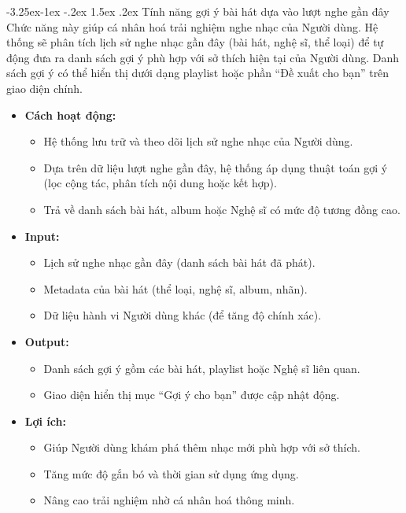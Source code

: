 \documentclass[a4paper]{article}
\makeatletter
\newcommand{\cach}{\hspace*{1.5em}\ignorespaces}
\newcounter {subsubsubsection}[subsubsection]
\newcommand\subsubsubsection{\@startsection{subsubsubsection}{4}{\z@}%
                                     {-3.25ex\@plus -1ex \@minus -.2ex}%
                                     {1.5ex \@plus .2ex}%
                                     {\normalfont\normalsize\bfseries}}
\makeatother
\begin{document}
\subsubsubsection{Tính năng gợi ý bài hát dựa vào lượt nghe gần đây}
\cach Chức năng này giúp cá nhân hoá trải nghiệm nghe nhạc của Người dùng. 
Hệ thống sẽ phân tích lịch sử nghe nhạc gần đây (bài hát, nghệ sĩ, thể loại) để tự động đưa ra danh sách gợi ý phù hợp với sở thích hiện tại của Người dùng. 
Danh sách gợi ý có thể hiển thị dưới dạng playlist hoặc phần “Đề xuất cho bạn” trên giao diện chính.
\begin{itemize}
    \item \textbf{Cách hoạt động:}
    \begin{itemize}
        \item Hệ thống lưu trữ và theo dõi lịch sử nghe nhạc của Người dùng.
        \item Dựa trên dữ liệu lượt nghe gần đây, hệ thống áp dụng thuật toán gợi ý (lọc cộng tác, phân tích nội dung hoặc kết hợp).
        \item Trả về danh sách bài hát, album hoặc Nghệ sĩ có mức độ tương đồng cao.
    \end{itemize}

    \item \textbf{Input:}
    \begin{itemize}
        \item Lịch sử nghe nhạc gần đây (danh sách bài hát đã phát).
        \item Metadata của bài hát (thể loại, nghệ sĩ, album, nhãn).
        \item Dữ liệu hành vi Người dùng khác (để tăng độ chính xác).
    \end{itemize}

    \item \textbf{Output:}
    \begin{itemize}
        \item Danh sách gợi ý gồm các bài hát, playlist hoặc Nghệ sĩ liên quan.
        \item Giao diện hiển thị mục “Gợi ý cho bạn” được cập nhật động.
    \end{itemize}

    \item \textbf{Lợi ích:}
    \begin{itemize}
        \item Giúp Người dùng khám phá thêm nhạc mới phù hợp với sở thích.
        \item Tăng mức độ gắn bó và thời gian sử dụng ứng dụng.
        \item Nâng cao trải nghiệm nhờ cá nhân hoá thông minh.
    \end{itemize}
\end{itemize}
\end{document}
